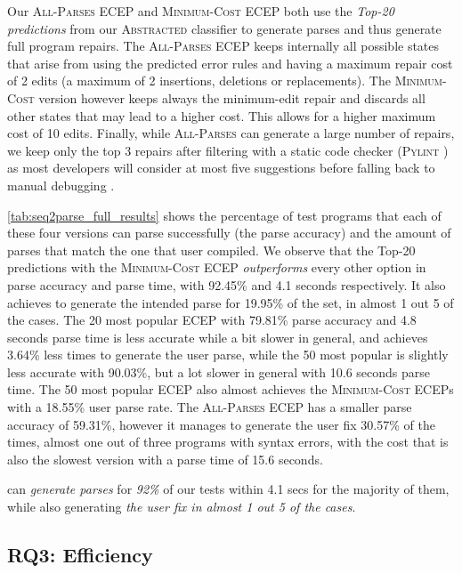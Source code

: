 Our \textsc{All-Parses} ECEP and \textsc{Minimum-Cost} ECEP both use the
\emph{Top-20 predictions} from our \textsc{Abstracted} classifier to generate
parses and thus generate full program repairs. The \textsc{All-Parses} ECEP
keeps internally all possible states that arise from using the predicted error
rules and having a maximum repair cost of 2 edits (\ie a maximum of 2
insertions, deletions or replacements). The \textsc{Minimum-Cost} version
however keeps always the minimum-edit repair and discards all other states that
may lead to a higher cost. This allows for a higher maximum cost of 10 edits.
Finally, while \textsc{All-Parses} can generate a large number of repairs, we
keep only the top 3 repairs after filtering with a static code checker
(\textsc{Pylint} \citep{pylint2022}) as most developers will consider at most five
suggestions before falling back to manual debugging \citep{Kochhar2016-oc,
Parnin2011-ce}.

\autoref{tab:seq2parse_full_results} shows the percentage of test programs that
each of these four versions can parse successfully (\ie the parse accuracy) and
the amount of parses that match the one that user compiled. We observe that the
Top-20 predictions with the \textsc{Minimum-Cost} ECEP \emph{outperforms} every
other option in parse accuracy and parse time, with 92.45\% and 4.1 seconds
respectively. It also achieves to generate the intended parse for 19.95\% of the
set, \ie in almost 1 out 5 of the cases. The 20 most popular ECEP with 79.81\%
parse accuracy and 4.8 seconds parse time is less accurate while a bit slower in
general, and achieves 3.64\% less times to generate the user parse, while the 50
most popular is slightly less accurate with 90.03\%, but a lot slower in general
with 10.6 seconds parse time. The 50 most popular ECEP also almost achieves the
\textsc{Minimum-Cost} ECEPs with a 18.55\% user parse rate. The
\textsc{All-Parses} ECEP has a smaller parse accuracy of 59.31\%, however it
manages to generate the user fix 30.57\% of the times, \ie almost one out of
three programs with syntax errors, with the cost that is also the slowest
version with a parse time of 15.6 seconds.

\begin{framed}
  \noindent \toolname can \emph{generate parses} for \emph{92\%} of our tests
  within 4.1 secs for the majority of them, while also generating \emph{the user
  fix in almost 1 out 5 of the cases}.
\end{framed}

\subsection{RQ3: Efficiency}
\label{sec:eval:efficiency}


